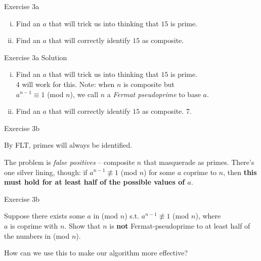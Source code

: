 \documentclass[10pt]{beamer}
\begin{document}
\begin{frame}[fragile]{Exercise 3a}

\begin{enumerate}[(i)]
\item Find an $a$ that will trick us into thinking that $15$ is prime.
\item Find an $a$ that will correctly identify $15$ as composite.
\end{enumerate}

\end{frame}

\begin{frame}[fragile]{Exercise 3a {\color{red} Solution}}

\begin{enumerate}[(i)]
\item Find an $a$ that will trick us into thinking that $15$ is prime. \\
{\color{red} $4$ will work for this. Note: when $n$ is composite but \\
$a^{n - 1} \equiv 1$ (mod $n$), we call $n$ a \textit{Fermat pseudoprime} to base $a$.}
\item Find an $a$ that will correctly identify $15$ as composite. {\color{red} 7.}
\end{enumerate}

\end{frame}

\begin{frame}[fragile]{Exercise 3b}

By FLT, primes will always be identified.

The problem is \textit{false positives} -- composite $n$ that masquerade as primes. There's one silver lining, though: if $a^{n - 1} \not\equiv 1$ (mod $n$) for some $a$ coprime to $n$, then \textbf{this must hold for at least half of the possible values of $a$}.

\end{frame}

\begin{frame}[fragile]{Exercise 3b}

Suppose there exists some $a$ in (mod $n$) s.t. $a^{n - 1} \not\equiv 1$ (mod $n$), where \\
$a$ is coprime with $n$. Show that $n$ is \textbf{not} Fermat-pseudoprime to at least half of the numbers in (mod $n$).

How can we use this to make our algorithm more effective?

\end{frame}
\end{document}
